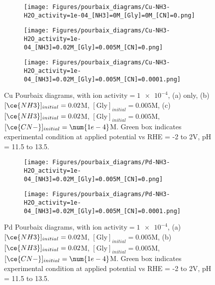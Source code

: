 \begin{figure}[htbp]
    \centering
    \begin{subfigure}[b]{0.3\textwidth}
        \subcaption{}\label{fig:Cu_Pourbaix_H2O}
        \texttt{[image: Figures/pourbaix\_diagrams/Cu-NH3-H2O\_activity=1e-04\_[NH3]=0M\_[Gly]=0M\_[CN]=0.png]}
        \par\medskip
    \end{subfigure}
    \begin{subfigure}[b]{0.3\textwidth}
        \subcaption{}\label{fig:Cu_Pourbaix_NH3_Gly}
        \texttt{[image: Figures/pourbaix\_diagrams/Cu-NH3-H2O\_activity=1e-04\_[NH3]=0.02M\_[Gly]=0.005M\_[CN]=0.png]}
        \par\medskip
    \end{subfigure}
    \begin{subfigure}[b]{0.3\textwidth}
        \subcaption{}\label{fig:Cu_Pourbaix_NH3_Gly_CN}
        \texttt{[image: Figures/pourbaix\_diagrams/Cu-NH3-H2O\_activity=1e-04\_[NH3]=0.02M\_[Gly]=0.005M\_[CN]=0.0001.png]}
        \par\medskip   
    \end{subfigure}
    \caption{Cu Pourbaix diagrams, with $\text{ion activity}=\num{1e-4}$, (a) only, (b)$[\ce{NH3}]_{initial}= 0.02$M, $[\text{Gly}]_{initial}=0.005$M, (c)$[\ce{NH3}]_{initial}= 0.02$M, $[\text{Gly}]_{initial}=0.005$M,  $[\ce{CN-}]_{initial}=\num{1e-4}$M. Green box indicates experimental condition at applied potential vs RHE = -2 to 2V, pH = 11.5 to 13.5.}
    \label{fig:Cu_Pourbaix}
\end{figure}
\begin{figure}[htbp]
    \centering
    \begin{subfigure}[b]{0.45\textwidth}
        \subcaption{}\label{fig:Pd_Pourbaix_NH3_Gly}
        \texttt{[image: Figures/pourbaix\_diagrams/Pd-NH3-H2O\_activity=1e-04\_[NH3]=0.02M\_[Gly]=0.005M\_[CN]=0.png]}
        \par\medskip
    \end{subfigure}
    \begin{subfigure}[b]{0.45\textwidth}
        \subcaption{}\label{fig:Pd_Pourbaix_NH3_Gly_CN}
        \texttt{[image: Figures/pourbaix\_diagrams/Pd-NH3-H2O\_activity=1e-04\_[NH3]=0.02M\_[Gly]=0.005M\_[CN]=0.0001.png]}
        \par\medskip   
    \end{subfigure}

    \caption{Pd Pourbaix diagrams, with $\text{ion activity}=\num{1e-4}$, (a)$[\ce{NH3}]_{initial}= 0.02$M, $[\text{Gly}]_{initial}=0.005$M, (b)$[\ce{NH3}]_{initial}= 0.02$M, $[\text{Gly}]_{initial}=0.005$M,  $[\ce{CN-}]_{initial}=\num{1e-4}$M. Green box indicates experimental condition at applied potential vs RHE = -2 to 2V, pH = 11.5 to 13.5.}
    \label{fig:Pd_Pourbaix}
\end{figure}
